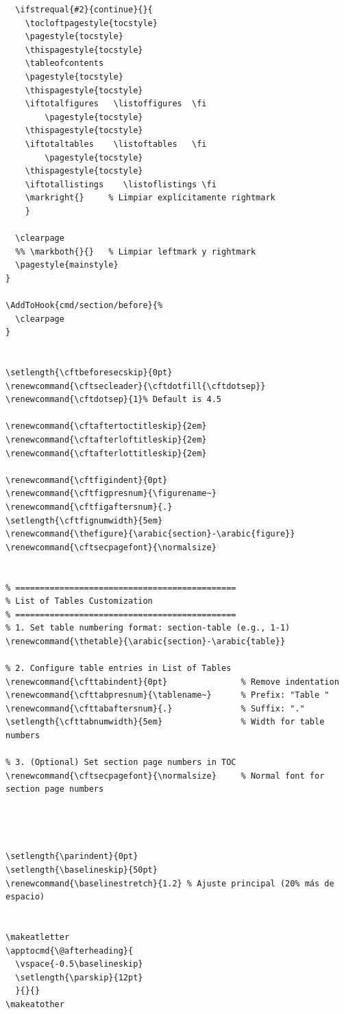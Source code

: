 \documentclass[english]{reporti}
\begin{document}
\begin{verbatim}
  \ifstrequal{#2}{continue}{}{
    \tocloftpagestyle{tocstyle}
    \pagestyle{tocstyle}
    \thispagestyle{tocstyle}
    \tableofcontents
    \pagestyle{tocstyle}
    \thispagestyle{tocstyle}    
    \iftotalfigures   \listoffigures  \fi
        \pagestyle{tocstyle}
    \thispagestyle{tocstyle}
    \iftotaltables    \listoftables   \fi
        \pagestyle{tocstyle}
    \thispagestyle{tocstyle}
    \iftotallistings    \listoflistings \fi
    \markright{}     % Limpiar explícitamente rightmark
    }

  \clearpage
  %% \markboth{}{}   % Limpiar leftmark y rightmark
  \pagestyle{mainstyle}
}

\AddToHook{cmd/section/before}{%
  \clearpage
}


\setlength{\cftbeforesecskip}{0pt}
\renewcommand{\cftsecleader}{\cftdotfill{\cftdotsep}}
\renewcommand{\cftdotsep}{1}% Default is 4.5

\renewcommand{\cftaftertoctitleskip}{2em}
\renewcommand{\cftafterloftitleskip}{2em}
\renewcommand{\cftafterlottitleskip}{2em}

\renewcommand{\cftfigindent}{0pt}
\renewcommand{\cftfigpresnum}{\figurename~}
\renewcommand{\cftfigaftersnum}{.}
\setlength{\cftfignumwidth}{5em}
\renewcommand{\thefigure}{\arabic{section}-\arabic{figure}}
\renewcommand{\cftsecpagefont}{\normalsize}


% =============================================
% List of Tables Customization
% =============================================
% 1. Set table numbering format: section-table (e.g., 1-1)
\renewcommand{\thetable}{\arabic{section}-\arabic{table}}

% 2. Configure table entries in List of Tables
\renewcommand{\cfttabindent}{0pt}               % Remove indentation
\renewcommand{\cfttabpresnum}{\tablename~}      % Prefix: "Table "
\renewcommand{\cfttabaftersnum}{.}              % Suffix: "."
\setlength{\cfttabnumwidth}{5em}                % Width for table numbers

% 3. (Optional) Set section page numbers in TOC
\renewcommand{\cftsecpagefont}{\normalsize}     % Normal font for section page numbers




\setlength{\parindent}{0pt}
\setlength{\baselineskip}{50pt}
\renewcommand{\baselinestretch}{1.2} % Ajuste principal (20% más de espacio)


\makeatletter
\apptocmd{\@afterheading}{
  \vspace{-0.5\baselineskip}
  \setlength{\parskip}{12pt}
  }{}{}
\makeatother




\end{verbatim}
\end{document}
